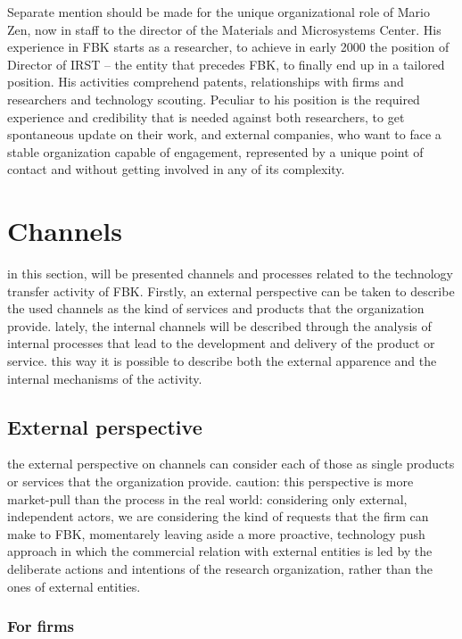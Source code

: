 Separate mention should be made for the unique organizational role of Mario Zen, now in staff to the director of the Materials and Microsystems Center. His experience in FBK starts as a researcher, to achieve in early 2000 the position of Director of IRST – the entity that precedes FBK, to finally end up in a tailored position. His activities comprehend patents, relationships with firms and researchers and technology scouting. Peculiar to his position is the required experience and credibility that is needed against both researchers, to get spontaneous update on their work, and external companies, who want to face a stable organization capable of engagement, represented by a unique point of contact and without getting involved in any of its complexity.


\section{Channels}

in this section, will be presented channels and processes related to the technology transfer activity of FBK. Firstly, an external perspective can be taken to describe the used channels as the kind of services and products that the organization provide. lately, the internal channels will be described through the analysis of internal processes that lead to the development and delivery of the product or service. this way it is possible to describe both the external apparence and the internal mechanisms of the activity. 

\subsection{External perspective}

the external perspective on channels can consider each of those as single products or services that the organization provide. caution: this perspective is more market-pull than the process in the real world: considering only external, independent actors, we are considering the kind of requests that the firm can make to FBK, momentarely leaving aside a more proactive, technology push approach in which the commercial relation with external entities is led by the deliberate actions and intentions of the research organization, rather than the ones of external entities.

\subsubsection{For firms}


